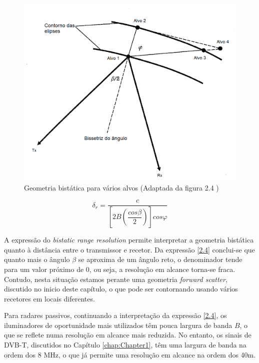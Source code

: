 \begin{figure}[h]
\centering
\includegraphics[scale=0.5]{chapters/ch2/assets/geom_varios_alvos}
\caption[Geometria bistática para vários alvos]{Geometria bistática para vários alvos (Adaptada da figura 2.4 \cite{Griffiths2017})}
\label{fig:geom_varios_alvos}
\end{figure}


\begin{equation} \label{2.4}
\delta_{r}=\dfrac{c}{\left[ 2B\left( \dfrac{cos\beta}{2}\right)\right] cos\varphi}
\end{equation}


A expressão do \textit{bistatic range resolution} permite interpretar a geometria bistática quanto à distância entre o transmissor e recetor. Da expressão \ref{2.4} conclui-se que quanto mais o ângulo $\beta$ se aproxima de um ângulo reto, o denominador tende para um valor próximo de 0, ou seja, a resolução em alcance torna-se fraca. Contudo, nesta situação estamos perante uma geometria \textit{forward scatter}, discutido no inicio deste capítulo, o que pode ser contornando usando vários recetores em locais diferentes.\par 
Para radares passivos, continuando a interpretação da expressão \ref{2.4}, os iluminadores de oportunidade mais utilizados têm pouca largura de banda $B$, o que se reflete numa resolução em alcance mais reduzida. No entanto, os sinais de DVB-T, discutidos no Capítulo \ref{chap:Chapter1}, têm uma largura de banda na ordem dos 8 MHz, o que já permite uma resolução em alcance na ordem dos 40m.

